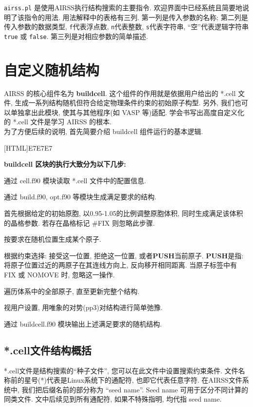 \documentclass[a4paper, 10pt]{article}
\begin{document}
\verb|airss.pl| 是使用AIRSS执行结构搜索的主要指令. 欢迎界面中已经系统且简要地说明了该指令的用法. 用法解释中的表格有三列. 第一列是传入参数的名称; 第二列是传入参数的数据类型, \verb|f|代表浮点数, \verb|n|代表整数, \verb|s|代表字符串, ``空''代表逻辑字符串 \verb!true! 或 \verb!false!. 第三列是对相应参数的简单描述.

\newpage
\section{自定义随机结构}
AIRSS 的核心组件名为 \textbf{buildcell}. 这个组件的作用就是依据用户给出的 *.cell 文件, 生成一系列结构随机但符合给定物理条件约束的初始原子构型. 另外, 我们也可以单独拿出此模块, 使其与其他程序(如 VASP 等)适配. 学会书写出高度自定义化的 *.cell 文件是学习 AIRSS 的根本.\\

为了方便后续的说明, 首先简要介绍 buildcell 组件运行的基本逻辑. 

\noindent{}[HTML]{E7E7E7}{\parbox{\textwidth}{%
\noindent \textbf{buildcell 区块的执行大致分为以下几步:}
\begin{maineu}
\item 通过 cell.f90 模块读取 *.cell 文件中的配置信息.
\item 通过 build.f90, opt.f90 等模块生成满足要求的结构. 
  \begin{subeu}
    \item 首先根据给定的初始原胞, 以0.95-1.05的比例调整原胞体积, 同时生成满足该体积的晶格参数. 若存在晶格标记 \#FIX 则忽略此步骤.
    \item 按要求在随机位置生成某个原子.
    \item 根据约束选择: 接受这一位置, 拒绝这一位置, 或者\textbf{PUSH}当前原子. \textbf{PUSH}是指: 将原子位置过近的两原子在其连线方向上, 反向移开相同距离. 当原子标签中有 FIX 或 NOMOVE 时, 忽略这一操作.
    \item 遍历体系中的全部原子, 直至更新完整个结构.
    \item 视用户设置, 用唯象的对势(pp3)对结构进行简单弛豫.
  \end{subeu}
\item 通过 buildcell.f90 模块输出上述满足要求的随机结构.
\end{maineu}}}

\subsection{*.cell文件结构概括}
*.cell文件是结构搜索的``种子文件'', 您可以在此文件中设置搜索约束条件. 文件名称前的星号(*)代表是Linux系统下的通配符, 也即它代表任意字符. 在AIRSS文件系统中, 我们把后缀名前的部分称为 ``seed name''. Seed name 可用于区分不同计算的同类文件. 文中后续见到所有通配符, 如果不特殊指明, 均代指 seed name.
\end{document}
